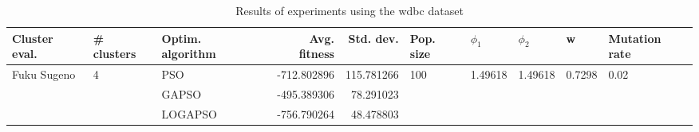 \begin{table}
\centering
\caption{Results of experiments using the wdbc dataset}
\begin{tabular}{lllrrlllll}
\toprule
               Cluster eval. &        \# clusters & Optim. algorithm &  Avg. fitness &  Std. dev. &            Pop. size &               $\phi_{1}$ &               $\phi_{2}$ &                       w &         Mutation rate \\
\midrule
\multirow{3}{*}{Fuku Sugeno} & \multirow{3}{*}{4} &              PSO &   -712.802896 & 115.781266 & \multirow{3}{*}{100} & \multirow{3}{*}{1.49618} & \multirow{3}{*}{1.49618} & \multirow{3}{*}{0.7298} & \multirow{3}{*}{0.02} \\
                             &                    &            GAPSO &   -495.389306 &  78.291023 &                      &                          &                          &                         &                       \\
                             &                    &          LOGAPSO &   -756.790264 &  48.478803 &                      &                          &                          &                         &                       \\
\bottomrule
\end{tabular}
\end{table}
